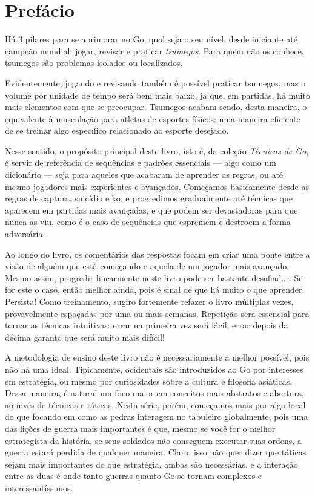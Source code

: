 \chapter{Prefácio}

Há 3 pilares para se aprimorar no Go, qual seja o seu nível, desde iniciante até campeão mundial: jogar, revisar e praticar \emph{tsumegos}. Para quem não os conhece, tsumegos são problemas isolados ou localizados.

Evidentemente, jogando e revisando também é possível praticar tsumegos, mas o volume por unidade de tempo será bem mais baixo, já que, em partidas, há muito mais elementos com que se preocupar. Tsumegos acabam sendo, desta maneira, o equivalente à musculação para atletas de esportes físicos: uma maneira eficiente de se treinar algo específico relacionado ao esporte desejado.

Nesse sentido, o propósito principal deste livro, isto é, da coleção \emph{Técnicas de Go}, é servir de referência de sequências e padrões essenciais --- algo como um dicionário --- seja para aqueles que acabaram de aprender as regras, ou até mesmo jogadores mais experientes e avançados. Começamos basicamente desde as regras de captura, suicídio e ko, e progredimos gradualmente até técnicas que aparecem em partidas mais avançadas, e que podem ser devastadoras para que nunca as viu, como é o caso de sequências que espremem e destroem a forma adversária. 

Ao longo do livro, os comentários das respostas focam em criar uma ponte entre a visão de alguém que está começando e aquela de um jogador mais avançado. Mesmo assim, progredir linearmente neste livro pode ser bastante desafiador. Se for este o caso, então melhor ainda, pois é sinal de que há muito o que aprender. Persista! Como treinamento, sugiro fortemente refazer o livro múltiplas vezes, provavelmente espaçadas por uma ou mais semanas. Repetição será essencial para tornar as técnicas intuitivas: errar na primeira vez será fácil, errar depois da décima garanto que será muito mais difícil!

A metodologia de ensino deste livro não é necessariamente a melhor possível, pois não há uma ideal. Tipicamente, ocidentais são introduzidos ao Go por interesses em estratégia, ou mesmo por curiosidades sobre a cultura e filosofia asiáticas. Dessa maneira, é natural um foco maior em conceitos mais abstratos e abertura, ao invés de técnicas e táticas. Nesta série, porém, começamos mais por algo local do que focando em como as pedras interagem no tabuleiro globalmente, pois uma das lições de guerra mais importantes é que, mesmo se você for o melhor estrategista da história, se seus soldados não conseguem executar suas ordens, a guerra estará perdida de qualquer maneira. Claro, isso não quer dizer que táticas sejam mais importantes do que estratégia, ambas são necessárias, e a interação entre as duas é onde tanto guerras quanto Go se tornam complexos e interessantíssimos.

